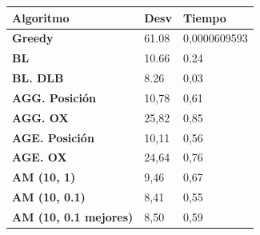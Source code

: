 \documentclass[a4paper, 12pt]{article}
\begin{document}
	\newpage
	\begin{table}[H]
\centering
\label{my-label}
\begin{tabular}{|l|l|l|}
\hline
\textbf{Algoritmo}            & \textbf{Desv} & \textbf{Tiempo} \\ \hline
\textbf{Greedy}               & 61.08         & 0,0000609593    \\ \hline
\textbf{BL}                   & 10.66         & 0.24            \\ \hline
\textbf{BL. DLB}              & 8.26          & 0,03            \\ \hline
\textbf{AGG. Posición}        & 10,78         & 0,61            \\ \hline
\textbf{AGG. OX}              & 25,82         & 0,85            \\ \hline
\textbf{AGE. Posición}        & 10,11         & 0,56            \\ \hline
\textbf{AGE. OX}              & 24,64         & 0,76            \\ \hline
\textbf{AM (10, 1)}           & 9,46          & 0,67            \\ \hline
\textbf{AM (10, 0.1)}         & 8,41          & 0,55            \\ \hline
\textbf{AM (10, 0.1 mejores)} & 8,50          & 0,59            \\ \hline
\end{tabular}
\end{table}
   
\printindex
\end{document}
